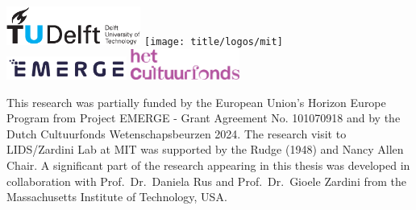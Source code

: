 \begin{titlepage}
\begin{tabular}{p{4.5cm}l}
\end{tabular}



\begin{center}
    \includegraphics[height=0.5in]{title/logos/tudelft}
    \hspace{3em}
    \texttt{[image: title/logos/mit]}\\
    \vspace{0.5em}
    \includegraphics[height=0.3in]{title/logos/emerge}
    \hspace{3em}
    \includegraphics[height=0.4in]{title/logos/cultuurfonds}
\end{center}
\vfill

\noindent This research was partially funded by the European Union’s Horizon Europe Program from Project EMERGE - Grant Agreement No. 101070918 and by the Dutch Cultuurfonds Wetenschapsbeurzen 2024. The research visit to LIDS/Zardini Lab at MIT was supported by the Rudge (1948) and Nancy Allen Chair.
A significant part of the research appearing in this thesis was developed in collaboration with Prof.\ Dr.\ Daniela Rus and Prof.\ Dr.\ Gioele Zardini from the Massachusetts Institute of Technology, USA.


\end{titlepage}
